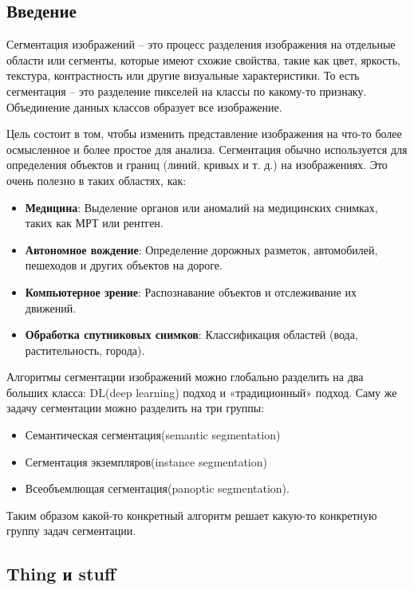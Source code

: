 
\subsection{Введение}

Сегментация изображений – это процесс разделения изображения на отдельные области или сегменты, которые имеют схожие свойства, такие как цвет, яркость, текстура, контрастность или другие визуальные характеристики. То есть сегментация – это разделение пикселей на классы по какому-то признаку. Объединение данных классов образует все изображение.

Цель состоит в том, чтобы изменить представление изображения на что-то более осмысленное и более простое для анализа. Сегментация обычно используется для определения объектов и границ (линий, кривых и т. д.) на изображениях. Это очень полезно в таких областях, как:

\begin{itemize}
    \item \textbf{Медицина}: Выделение органов или аномалий на медицинских снимках, таких как МРТ или рентген.
    \item \textbf{Автономное вождение}: Определение дорожных разметок, автомобилей, пешеходов и других объектов на дороге.
    \item \textbf{Компьютерное зрение}: Распознавание объектов и отслеживание их движений.
    \item \textbf{Обработка спутниковых снимков}: Классификация областей (вода, растительность, города).
\end{itemize}

Алгоритмы сегментации изображений можно глобально разделить на два больших класса: DL(deep learning) подход и «традиционный» подход. Саму же задачу сегментации можно разделить на три группы:

\begin{itemize}
    \item Семантическая сегментация(semantic segmentation)
    \item Сегментация экземпляров(instance segmentation)
    \item Всеобъемлющая сегментация(panoptic segmentation).
\end{itemize}

Таким образом какой-то конкретный алгоритм решает какую-то конкретную группу задач сегментации.

\subsection{Thing и stuff}

